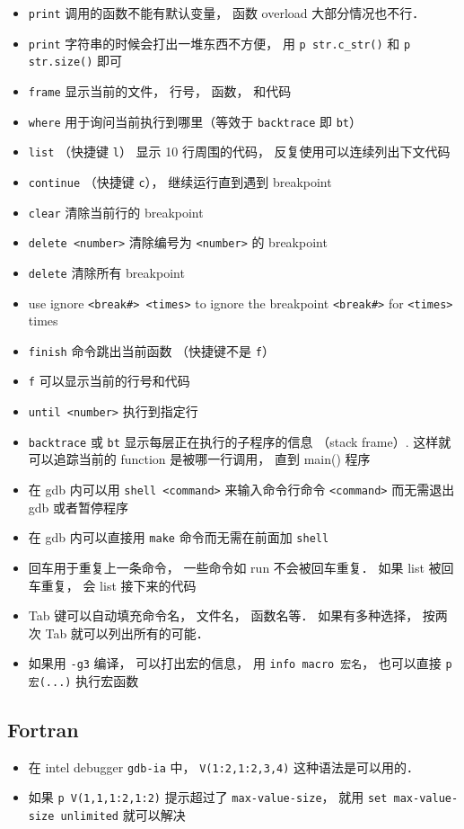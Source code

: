 \begin{itemize}
\item \verb`print` 调用的函数不能有默认变量， 函数 overload 大部分情况也不行．
\item \verb`print` 字符串的时候会打出一堆东西不方便， 用 \verb`p str.c_str()` 和 \verb`p str.size()` 即可
\item \verb`frame` 显示当前的文件， 行号， 函数， 和代码
\item \verb`where` 用于询问当前执行到哪里（等效于 \verb`backtrace` 即 \verb`bt`）
\item \verb`list` （快捷键 \verb`l`） 显示 10 行周围的代码， 反复使用可以连续列出下文代码
\item \verb`continue` （快捷键 \verb`c`）， 继续运行直到遇到 breakpoint
\item \verb`clear` 清除当前行的 breakpoint
\item \verb`delete <number>` 清除编号为 \verb`<number>` 的 breakpoint
\item \verb`delete` 清除所有 breakpoint
\item use ignore \verb`<break#> <times>` to ignore the breakpoint \verb`<break#>` for \verb`<times>` times
\item \verb`finish` 命令跳出当前函数 （快捷键不是 \verb`f`）
\item \verb`f` 可以显示当前的行号和代码
\item \verb`until <number>` 执行到指定行
\item \verb`backtrace` 或 \verb`bt` 显示每层正在执行的子程序的信息 （stack frame）. 这样就可以追踪当前的 function 是被哪一行调用， 直到 main() 程序

\item 在 gdb 内可以用 \verb`shell <command>` 来输入命令行命令 \verb`<command>` 而无需退出 gdb 或者暂停程序
\item 在 gdb 内可以直接用 \verb`make` 命令而无需在前面加 \verb`shell`
\item 回车用于重复上一条命令， 一些命令如 run 不会被回车重复． 如果 list 被回车重复， 会 list 接下来的代码
\item Tab 键可以自动填充命令名， 文件名， 函数名等． 如果有多种选择， 按两次 Tab 就可以列出所有的可能．
\item 如果用 \verb|-g3| 编译， 可以打出宏的信息， 用 \verb|info macro 宏名|， 也可以直接 \verb|p 宏(...)| 执行宏函数
\end{itemize}

\subsection{Fortran}
\begin{itemize}
\item 在 intel debugger \verb`gdb-ia` 中， \verb`V(1:2,1:2,3,4)` 这种语法是可以用的．
\item 如果 \verb`p V(1,1,1:2,1:2)` 提示超过了 \verb`max-value-size`， 就用 \verb`set max-value-size unlimited` 就可以解决
\end{itemize}

